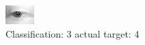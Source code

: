 \begin{figure}[h!]
\begin{center}
\includegraphics[width=0.60\columnwidth]{figures/ID2587_class_3_target_4.png}
\end{center}
\caption{ Classification: 3 actual target: 4}
\label{fig:ID2587_class_3_target_4}
\end{figure}
